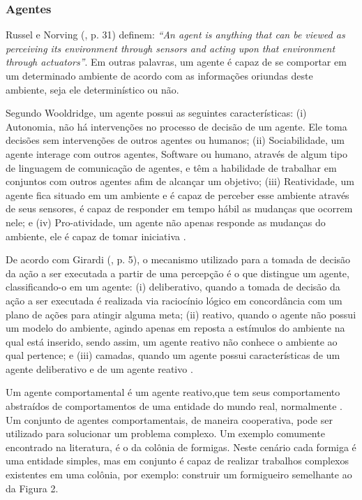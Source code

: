 \subsubsection{Agentes}

Russel e Norving (\citeyear{russel2003}, p. 31) definem: \textit{“An agent is anything that can be viewed as perceiving its environment through sensors and acting upon that environment through actuators”}. Em outras palavras, um agente é capaz de se comportar em um determinado ambiente de acordo com as informações oriundas deste ambiente, seja ele determinístico ou não.

Segundo Wooldridge, um agente possui as seguintes características: (i) Autonomia, não há intervenções no processo de decisão de um agente. Ele toma decisões sem intervenções de outros agentes ou humanos; (ii) Sociabilidade, um agente interage com outros agentes, Software ou humano, através de algum tipo de linguagem de comunicação de agentes, e têm a habilidade de trabalhar em conjuntos com outros agentes afim de alcançar um objetivo; (iii) Reatividade, um agente fica situado em um ambiente e é capaz de perceber esse ambiente através de seus sensores, é capaz de responder em tempo hábil as mudanças que ocorrem nele; e (iv) Pro-atividade, um agente não apenas responde as mudanças do ambiente, ele é capaz de tomar iniciativa \cite[p. 2-3]{wooldrige2002}.

De acordo com Girardi (\citeyear{girardi2004}, p. 5), o mecanismo utilizado para a tomada de decisão da ação a ser executada a partir de uma percepção é o que distingue um agente, classificando-o em um agente: (i) deliberativo, quando a tomada de decisão da ação a ser executada é realizada via raciocínio lógico em concordância com um plano de ações para atingir alguma meta; (ii) reativo, quando o agente não possui um modelo do ambiente, agindo apenas em reposta a estímulos do ambiente na qual está inserido, sendo assim, um agente reativo não conhece o ambiente ao qual pertence; e (iii) camadas, quando um agente possui características de um agente deliberativo e de um agente reativo \cite[p. 5]{girardi2004}. 


Um agente comportamental é um agente reativo,que tem seus comportamento abstraídos de comportamentos de uma entidade do mundo real, normalmente \cite[p. 33]{oliveira2008}. Um conjunto de agentes comportamentais, de maneira cooperativa, pode ser utilizado para solucionar um problema complexo. Um exemplo comumente encontrado na literatura, é o da colônia de formigas. Neste cenário cada formiga é uma entidade simples, mas em conjunto é capaz de realizar trabalhos complexos existentes em uma colônia, por exemplo: construir um formigueiro semelhante ao da Figura 2.

